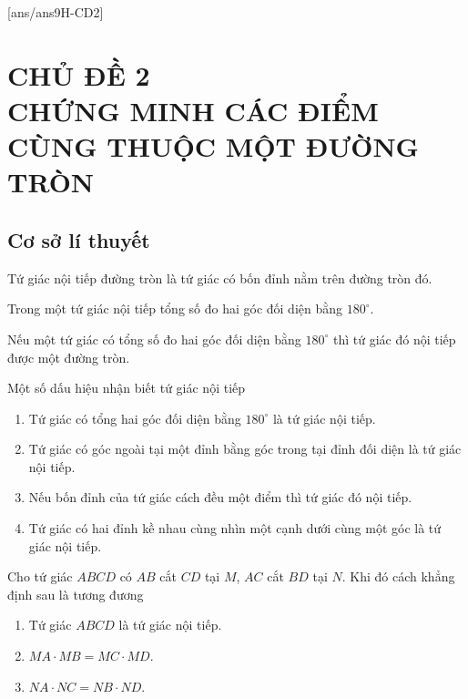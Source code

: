[ans/ans9H-CD2]
\chapter*{CHỦ ĐỀ 2 \\ CHỨNG MINH CÁC ĐIỂM CÙNG THUỘC MỘT ĐƯỜNG TRÒN}
\setcounter{section}{0}
\setcounter{ex}{0}
\section{Cơ sở lí thuyết}
\begin{dn}
Tứ giác nội tiếp đường tròn là tứ giác có bốn đỉnh nằm trên đường tròn đó.
\end{dn}

\begin{dl}
Trong một tứ giác nội tiếp tổng số đo hai góc đối diện bằng $180^{\circ}$.
\end{dl}
\begin{dl}
Nếu một tứ giác có tổng số đo hai góc đối diện bằng $180^{\circ}$ thì tứ giác đó nội tiếp được một đường tròn.
\end{dl}

\begin{dl} Một số dấu hiệu nhận biết tứ giác nội tiếp
\begin{enumerate}
\item Tứ giác có tổng hai góc đối diện bằng $180^\circ$ là tứ giác nội tiếp.
\item Tứ giác có góc ngoài tại một đỉnh bằng góc trong tại đỉnh đối diện là tứ giác nội tiếp.
\item Nếu bốn đỉnh của tứ giác cách đều một điểm thì tứ giác đó nội tiếp.
\item Tứ giác có hai đỉnh kề nhau cùng nhìn một cạnh dưới cùng một góc là tứ giác nội tiếp.
\end{enumerate}
\end{dl}

\begin{dl}\label{dinhli4}
    Cho tứ giác $ABCD$ có $AB$ cắt $CD$ tại $M$, $AC$ cắt $BD$ tại $N$. Khi đó cách khẳng định sau là tương đương
    \begin{enumerate}
    \item Tứ giác $ABCD$ là tứ giác nội tiếp.
    \item $MA\cdot MB= MC\cdot MD$.
    \item $NA\cdot NC= NB\cdot ND$.
    \end{enumerate}
\end{dl}

